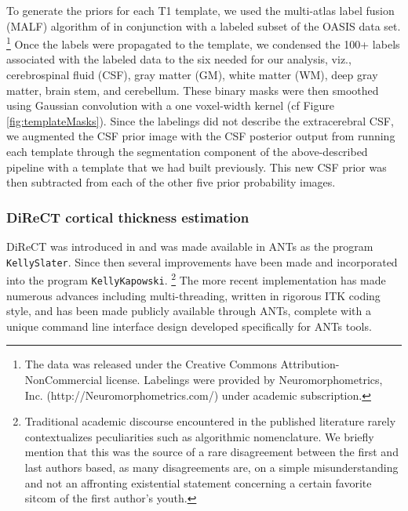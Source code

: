 To generate the priors for each T1 template, we used the multi-atlas label fusion (MALF) 
algorithm of \cite{wang2013} {\color{blue} in conjunction with a labeled subset of the
OASIS data set}.%
\footnote{
{\color{blue}{These data were originally acquired by the first and last
authors to aid in the MICCAI 2012 Grand Challenge and Workshop on Multi-Atlas Labeling.}}
The data was released under the Creative Commons Attribution-NonCommercial license. 
Labelings were provided by Neuromorphometrics, Inc. (http://Neuromorphometrics.com/) 
under academic subscription. 
}
Once the labels were propagated to the template, we condensed the 100+ labels associated
with the labeled data to the six needed for our analysis, viz., cerebrospinal fluid (CSF), 
gray matter (GM), white matter (WM), deep gray matter, brain stem, and cerebellum.  These binary
masks were then smoothed using Gaussian convolution with a one voxel-width kernel (cf
Figure \ref{fig:templateMasks}).  Since the labelings did not describe the extracerebral
CSF, we augmented the CSF prior image with the CSF posterior output from running each template 
through the segmentation component of the above-described pipeline with a template 
that we had built previously.  This new CSF prior was then subtracted from each of the
other five prior probability images.


\subsubsection{DiReCT cortical thickness estimation}

DiReCT was introduced 
in \cite{das2009} and was made available in ANTs as the program \verb#KellySlater#.
Since then several improvements have been made and incorporated into the program
\verb#KellyKapowski#.%
\footnote{
Traditional academic discourse encountered in the published literature
rarely contextualizes peculiarities such as algorithmic nomenclature.
We briefly mention that
this was the source of a rare disagreement between the first and last authors
based, as many disagreements are, on a simple misunderstanding and not an
affronting existential statement concerning a certain favorite sitcom
of the first author's youth. 
}
The more recent implementation has made numerous advances including
multi-threading, written in rigorous ITK coding style,%
 and
has been made publicly available through ANTs, complete with a unique command line
interface design developed specifically for ANTs tools.

